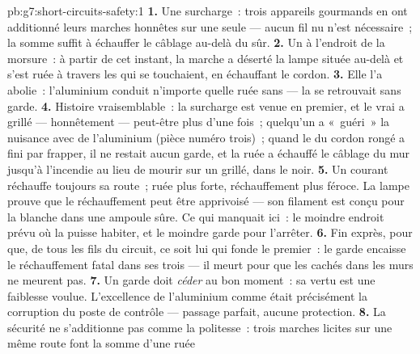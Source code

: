 \begin{solution}{pb:g7:short-circuits-safety:1}
\textbf{1.} Une surcharge~: trois appareils gourmands en  ont
additionné leurs marches honnêtes sur une seule  --- aucun fil
nu n'est nécessaire~; la somme suffit à échauffer le câblage au-delà
du sûr.
\textbf{2.} Un  à l'endroit de la morsure~: à partir de
cet instant, la marche a déserté la lampe située au-delà et s'est
ruée à travers les  qui se touchaient, en échauffant le
cordon.
\textbf{3.} Elle l'a abolie~: l'aluminium conduit n'importe quelle
ruée sans  --- la  se retrouvait sans garde.
\textbf{4.} Histoire vraisemblable~: la surcharge est venue en
premier, et le vrai  a grillé --- honnêtement --- peut-être
plus d'une fois~; quelqu'un a «~guéri~» la nuisance avec de
l'aluminium (pièce numéro trois)~; quand le  du cordon
rongé a fini par frapper, il ne restait aucun garde, et la ruée a
échauffé le câblage du mur jusqu'à l'incendie au lieu de mourir sur
un  grillé, dans le noir.
\textbf{5.} Un courant réchauffe toujours sa route~; ruée plus forte,
réchauffement plus féroce. La lampe prouve que le réchauffement peut
être apprivoisé --- son filament est conçu pour la  blanche
dans une ampoule sûre. Ce qui manquait ici~: le moindre endroit
prévu où la  puisse habiter, et le moindre garde pour
l'arrêter.
\textbf{6.} Fin exprès, pour que, de tous les fils du circuit, ce
soit lui qui fonde le premier~: le garde encaisse le réchauffement
fatal dans ses trois  --- il meurt pour que les 
cachés dans les murs ne meurent pas.
\textbf{7.} Un garde doit \emph{céder} au bon moment~: sa vertu est
une faiblesse voulue. L'excellence de l'aluminium comme 
était précisément la corruption du poste de contrôle --- passage
parfait, aucune protection.
\textbf{8.} La sécurité ne s'additionne pas comme la politesse~:
trois marches licites sur une même route font la somme d'une ruée

\end{solution}
